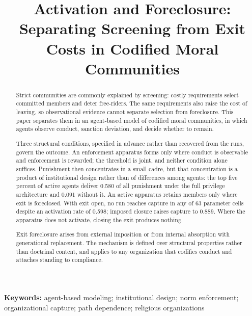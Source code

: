 \documentclass[12pt]{article}
\title{Activation and Foreclosure: Separating Screening from Exit Costs in Codified Moral Communities}
\author{}
\date{}
\date{}
\newcommand{\affiliation}{}
\begin{document}
\maketitle
\vspace{1em}


\begin{abstract}
Strict communities are commonly explained by screening: costly requirements select committed members and deter free-riders. The same requirements also raise the cost of leaving, so observational evidence cannot separate selection from foreclosure. This paper separates them in an agent-based model of codified moral communities, in which agents observe conduct, sanction deviation, and decide whether to remain.

Three structural conditions, specified in advance rather than recovered from the runs, govern the outcome. An enforcement apparatus forms only where conduct is observable and enforcement is rewarded; the threshold is joint, and neither condition alone suffices. Punishment then concentrates in a small cadre, but that concentration is a product of institutional design rather than of differences among agents: the top five percent of active agents deliver 0.580 of all punishment under the full privilege architecture and 0.091 without it. An active apparatus retains members only where exit is foreclosed. With exit open, no run reaches capture in any of 63 parameter cells despite an activation rate of 0.598; imposed closure raises capture to 0.889. Where the apparatus does not activate, closing the exit produces nothing.

Exit foreclosure arises from external imposition or from internal absorption with generational replacement. The mechanism is defined over structural properties rather than doctrinal content, and applies to any organization that codifies conduct and attaches standing to compliance.
\end{abstract}
\vspace{1em}\noindent\textbf{Keywords:} agent-based modeling; institutional design; norm enforcement; organizational capture; path dependence; religious organizations

\newpage

\end{document}
